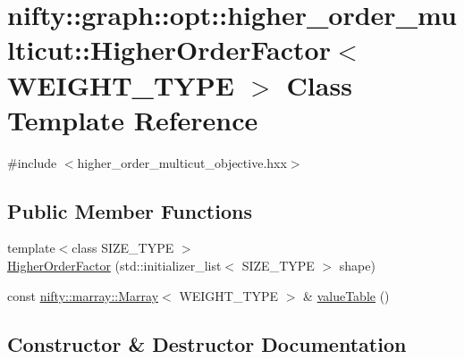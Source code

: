 \hypertarget{classnifty_1_1graph_1_1opt_1_1higher__order__multicut_1_1HigherOrderFactor}{}\section{nifty\+:\+:graph\+:\+:opt\+:\+:higher\+\_\+order\+\_\+multicut\+:\+:Higher\+Order\+Factor$<$ W\+E\+I\+G\+H\+T\+\_\+\+T\+Y\+PE $>$ Class Template Reference}
\label{classnifty_1_1graph_1_1opt_1_1higher__order__multicut_1_1HigherOrderFactor}


{\ttfamily \#include $<$higher\+\_\+order\+\_\+multicut\+\_\+objective.\+hxx$>$}

\subsection*{Public Member Functions}
\begin{DoxyCompactItemize}
\item 
{\footnotesize template$<$class S\+I\+Z\+E\+\_\+\+T\+Y\+PE $>$ }\\\hyperlink{classnifty_1_1graph_1_1opt_1_1higher__order__multicut_1_1HigherOrderFactor_a0746874bcc367003afa7e8ff0d5bfb25}{Higher\+Order\+Factor} (std\+::initializer\+\_\+list$<$ S\+I\+Z\+E\+\_\+\+T\+Y\+PE $>$ shape)
\item 
const \hyperlink{classandres_1_1Marray}{nifty\+::marray\+::\+Marray}$<$ W\+E\+I\+G\+H\+T\+\_\+\+T\+Y\+PE $>$ \& \hyperlink{classnifty_1_1graph_1_1opt_1_1higher__order__multicut_1_1HigherOrderFactor_a7425d7771d442ab8d8526de2f978eb0f}{value\+Table} ()
\end{DoxyCompactItemize}


\subsection{Constructor \& Destructor Documentation}
\mbox{\label{classnifty_1_1graph_1_1opt_1_1higher__order__multicut_1_1HigherOrderFactor_a0746874bcc367003afa7e8ff0d5bfb25}} 
